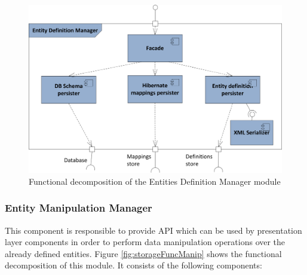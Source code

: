 \begin{figure}[h!]
  \centering
  	\includegraphics[scale=0.9]{storage/functional/func_access.png}
  \caption{Functional decomposition of the Entities Definition Manager module}
  \label{fig:storageFuncAccess}
\end{figure}

\subsubsection{Entity Manipulation Manager}

This component is responsible to provide API which can be used by presentation layer components in order to perform data manipulation operations over the already defined entities. Figure \ref{fig:storageFuncManip} shows the functional decomposition of this module. It consists of the following components:


